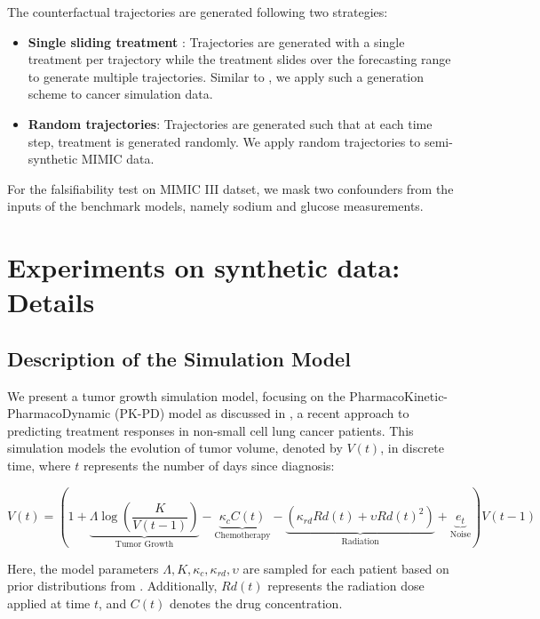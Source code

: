 \documentclass{article}
\theoremstyle{plain}
\theoremstyle{definition}
\theoremstyle{remark}
\begin{document}
The counterfactual trajectories are generated following two strategies: 
\begin{itemize}
    \item \textbf{Single sliding treatment} \citep{bica2020estimatingCRN, Melnychuk2022CausalTF}: Trajectories are generated with a single treatment per trajectory while the treatment slides over the forecasting range to generate multiple trajectories.  Similar to \cite{bica2020estimatingCRN}, we apply such a generation scheme to cancer simulation data.
    \item  \textbf{Random trajectories}: Trajectories are generated such that at each time step, treatment is generated randomly. We apply random trajectories to semi-synthetic MIMIC data.
\end{itemize}

For the falsifiability test on MIMIC III datset, we mask two confounders from the inputs of the benchmark models, namely sodium and glucose measurements.
\section{Experiments on synthetic data: Details} 
\subsection{Description of the Simulation Model}
\label{subsect: cancer_sim_descrip}

We present a tumor growth simulation model, focusing on the PharmacoKinetic-PharmacoDynamic (PK-PD) model as discussed in \cite{PK-PD}, a recent approach to predicting treatment responses in non-small cell lung cancer patients. This simulation models the evolution of tumor volume, denoted by \( V(t) \), in discrete time, where \( t \) represents the number of days since diagnosis:

\begin{equation}
V(t) = \left(1 + \underbrace{\Lambda \log \left(\frac{K}{V(t-1)}\right)}_{\text{Tumor Growth}} - \underbrace{\kappa_c C(t)}_{\text{Chemotherapy}} - \underbrace{\left(\kappa_{rd} Rd(t) + \upsilon Rd(t)^2\right)}_{\text{Radiation}} + \underbrace{e_t}_{\text{Noise}}\right) V(t-1)
\end{equation}

Here, the model parameters \( \Lambda, K, \kappa_c, \kappa_{rd}, \upsilon \) are sampled for each patient based on prior distributions from \cite{PK-PD}. Additionally, \( Rd(t) \) represents the radiation dose applied at time \( t \), and \( C(t) \) denotes the drug concentration. 
\end{document}

